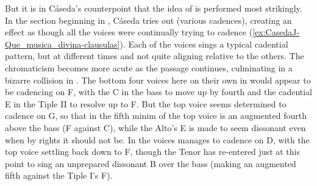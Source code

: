 But it is in Cáseda's counterpoint that the idea of  is performed most strikingly. 
In the section beginning in , Cáseda tries out  (various cadences), creating an effect as though all the voices were continually trying to cadence (\cref{ex:CasedaJ-Que_musica_divina-clausulas}).
Each of the voices sings a typical cadential pattern, but at different times and not quite aligning relative to the others.
The chromaticism becomes more acute as the passage continues, culminating in a bizarre collision in .
The bottom four voices here on their own in  would appear to be cadencing on F, with the C in the bass to move up by fourth and the cadential E in the Tiple II to resolve up to F.
But the top voice seems determined to cadence on G, so that in the fifth minim of  the top voice is an augmented fourth above the bass (F\sh{} against C), while the Alto's E is made to seem dissonant even when by rights it should not be.
In  the voices manages to cadence on D, with the top voice settling back down to F\sh, though the Tenor has re-entered just at this point to sing an unprepared dissonant B\fl{} over the bass (making an augmented fifth against the Tiple I's F\sh).

% 
% 

